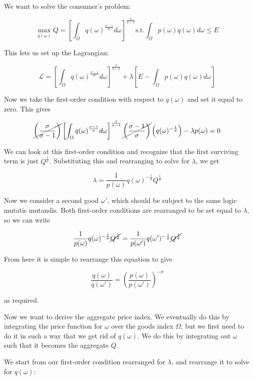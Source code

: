 \documentclass[12pt, letterpaper]{article}
\begin{document}
	We want to solve the consumer's problem:

	\[ \max_{q(\omega)} Q = \left[ \int_{\Omega} q(\omega)^{\frac{\sigma - 1}{\sigma}} d\omega \right]^{\frac{\sigma}{\sigma - 1}} \text{s.t.} \int_\Omega p(\omega) q(\omega) d\omega \leq E   \]

	This lets us set up the Lagrangian:

	\[ \mathcal{L} = \left[ \int_{\Omega} q(\omega)^{\frac{\sigma - 1}{\sigma}} d\omega \right]^{\frac{\sigma}{\sigma - 1}} + \lambda \left[ E - \int_\Omega p(\omega) q(\omega) d\omega \right]    \]

	Now we take the first-order condition with respect to \(q(\omega)\) and set it equal to zero. This gives

	\[ \cancel{\left( \frac{\sigma}{\sigma - 1} \right)} \left[ \int_{\Omega} q(\omega)^{\frac{\sigma - 1}{\sigma}} d\omega \right]^{\frac{1}{\sigma - 1}} \cancel{\left( \frac{\sigma - 1}{\sigma} \right)} \left( q(\omega)^{-\frac{1}{\sigma}} \right) - \lambda p(\omega) = 0   \]

	We can look at this first-order condition and recognize that the first surviving term is just \( Q^{\frac{1}{\sigma}}  \). Substituting this and rearranging to solve for \(\lambda\), we get 

	\[ \lambda = \frac{1}{p(\omega)} q(\omega)^{-\frac{1}{\sigma}} Q^{\frac{1}{\sigma}}   \]

	Now we consider a second good \(\omega'\), which should be subject to the same logic mutatis mutandis. Both first-order conditions are rearranged to be set equal to \(\lambda\), so we can write

	\[ \frac{1}{p(\omega)} q(\omega)^{-\frac{1}{\sigma}} \cancel{Q^{\frac{1}{\sigma}}}  = \frac{1}{p(\omega')} q(\omega')^{-\frac{1}{\sigma}} \cancel{Q^{\frac{1}{\sigma}}}   \]

	From here it is simple to rearrange this equation to give

	\[ \frac{q(\omega)}{q(\omega')} = \left(\frac{p(\omega)}{p(\omega')}\right)^{-\sigma}    \] 

	as required.

	Now we want to derive the aggregate price index. We eventually do this by integrating the price function for \(\omega\) over the goods index \(\Omega\), but we first need to do it in such a way that we get rid of \(q(\omega)\). We do this by integrating out \(\omega\) such that it becomes the aggregate \(Q\). 
	
	We start from our first-order condition rearranged for \(\lambda\), and rearrange it to solve for \(q(\omega)\):
\end{document}
